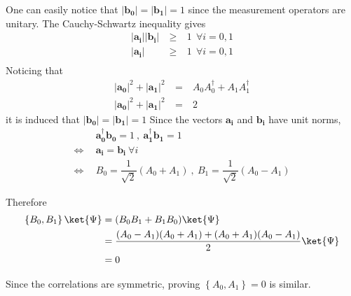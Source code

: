 One can easily notice that $|\mathbf{b_0}| =  |\mathbf{b_1}| = 1 $ since the measurement operators are unitary. 
The Cauchy-Schwartz inequality gives 
\begin{equation*}
    \begin{aligned}
        |\mathbf{a_i}| |\mathbf{b_i}| &\ \geq\ & 1 \ \ \forall i =0,1 \\
        |\mathbf{a_i}| &\ \geq\ & 1 \ \ \forall i =0,1 \\
    \end{aligned}
\end{equation*}
Noticing that 
\begin{equation*}
    \begin{aligned}
        |\mathbf{a_0}|^2 + |\mathbf{a_1}|^2 &\ =\ & A_0 A_0^\dagger + A_1 A_1^\dagger\\
         |\mathbf{a_0}|^2 + |\mathbf{a_1}|^2 &\ =\ & 2
    \end{aligned}
\end{equation*}
it is induced that $|\mathbf{b_0}| =  |\mathbf{b_1}| = 1 $ 
Since the vectors $\mathbf{a_i}$ and $ \mathbf{b_i}$ have unit norms, 
\begin{equation*}
    \begin{aligned}
         \ &\mathbf{a_0^\dagger}  \mathbf{b_0}  = 1  \ ,\    \mathbf{a_1^\dagger}   \mathbf{b_1} = 1 \\
     \Leftrightarrow\ \ &  \mathbf{a_i} = \mathbf{b_i} \ \forall i \\
     \Leftrightarrow\ \ & B_0 = \dfrac{1}{\sqrt{2}} (A_0 +A_1) \ ,\  B_1 = \dfrac{1}{\sqrt{2}} (A_0 -A_1)   
         \end{aligned}
\end{equation*}

Therefore
\begin{equation*}
\begin{aligned}
    \left\{ B_0, B_1 \right\}\ket{\Psi} & = (B_0B_1 + B_1 B_0)\ket{\Psi} \\
    & =  \dfrac{(A_0-A_1)(A_0+A_1) + (A_0+A_1)(A_0-A_1)}{2} \ket{\Psi} \\
    & =  0
\end{aligned}
\end{equation*}

Since the correlations are symmetric, proving $\left\{ A_0, A_1 \right\}=0$ is similar. 

